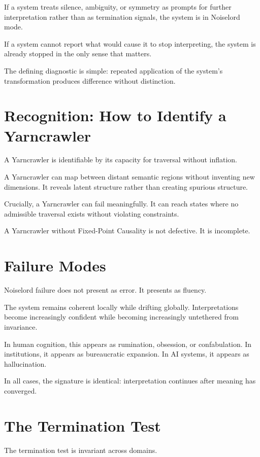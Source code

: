 \documentclass[12pt]{article}
\begin{document}
If a system treats silence, ambiguity, or symmetry as prompts for further interpretation rather than as termination signals, the system is in Noiselord mode.

If a system cannot report what would cause it to stop interpreting, the system is already stopped in the only sense that matters.

The defining diagnostic is simple: repeated application of the system’s transformation produces difference without distinction.

\section{Recognition: How to Identify a Yarncrawler}

A Yarncrawler is identifiable by its capacity for traversal without inflation.

A Yarncrawler can map between distant semantic regions without inventing new dimensions. It reveals latent structure rather than creating spurious structure.

Crucially, a Yarncrawler can fail meaningfully. It can reach states where no admissible traversal exists without violating constraints.

A Yarncrawler without Fixed-Point Causality is not defective. It is incomplete.

\section{Failure Modes}

Noiselord failure does not present as error. It presents as fluency.

The system remains coherent locally while drifting globally. Interpretations become increasingly confident while becoming increasingly untethered from invariance.

In human cognition, this appears as rumination, obsession, or confabulation. In institutions, it appears as bureaucratic expansion. In AI systems, it appears as hallucination.

In all cases, the signature is identical: interpretation continues after meaning has converged.

\section{The Termination Test}

The termination test is invariant across domains.
\end{document}
